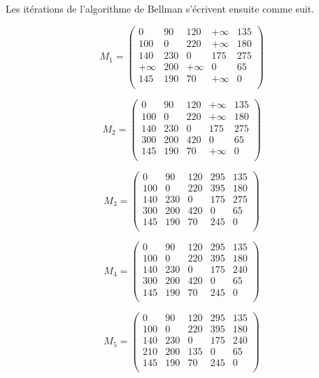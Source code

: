 \documentclass[paper=a4, fontsize=11pt]{scrartcl} %
\numberwithin{equation}{section} %
\numberwithin{figure}{section} %
\numberwithin{table}{section} %
\begin{document}
Les itérations de l'algorithme de Bellman s'écrivent ensuite comme suit.

$$
M_1 =
\begin{pmatrix}
  0& 90& 120& +\infty& 135\\
  100& 0& 220& +\infty& 180\\
  140& 230& 0& 175& 275\\
  +\infty& 200& +\infty& 0& 65\\
  145& 190& 70& +\infty& 0\\
  \end{pmatrix}
$$

$$
M_2 =
\begin{pmatrix}
  0& 90& 120& +\infty& 135\\
  100& 0& 220& +\infty& 180\\
  140& 230& 0& 175& 275\\
  300& 200& 420& 0& 65\\
  145& 190& 70& +\infty& 0\\
  \end{pmatrix}
$$

$$
M_3 = 
\begin{pmatrix}
  0& 90& 120& 295& 135\\
  100& 0& 220& 395& 180\\
  140& 230& 0& 175& 275\\
  300& 200& 420& 0& 65\\
  145& 190& 70& 245& 0\\
  \end{pmatrix}
$$

$$
M_4 = 
\begin{pmatrix}
  0& 90& 120& 295& 135\\
  100& 0& 220& 395& 180\\
  140& 230& 0& 175& 240\\
  300& 200& 420& 0& 65\\
  145& 190& 70& 245& 0\\
  \end{pmatrix}
$$

$$
M_5 = 
\begin{pmatrix}
  0& 90& 120& 295& 135\\
  100& 0& 220& 395& 180\\
  140& 230& 0& 175& 240\\
  210& 200& 135& 0& 65\\
  145& 190& 70& 245& 0\\
  \end{pmatrix}
  $$
\end{document}
